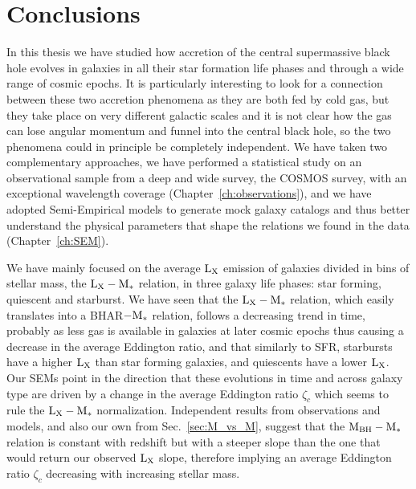 \chapter{Conclusions}


In this thesis we have studied how accretion of the central supermassive black hole evolves in galaxies in all their star formation life phases and through a wide range of cosmic epochs. It is particularly interesting to look for a connection between these two accretion phenomena as they are both fed by cold gas, but they take place on very different galactic scales and it is not clear how the gas can lose angular momentum and funnel into the central black hole, so the two phenomena could in principle be completely independent. We have taken two complementary approaches, we have performed a statistical study on an observational sample from a deep and wide survey, the COSMOS survey, with an exceptional wavelength coverage (Chapter~\ref{ch:observations}), and we have adopted Semi-Empirical models to generate mock galaxy catalogs and thus better understand the physical parameters that shape the relations we found in the data (Chapter~\ref{ch:SEM}).

We have mainly focused on the average ${\rm L}_{\rm X}$ emission of galaxies divided in bins of stellar mass, the ${\rm L}_{\rm X}-{\rm M}_*$ relation, in three galaxy life phases: star forming, quiescent and starburst. We have seen that the ${\rm L}_{\rm X}-{\rm M}_*$ relation, which easily translates into a BHAR$-{\rm M}_*$ relation, follows a decreasing trend in time, probably as less gas is available in galaxies at later cosmic epochs thus causing a decrease in the average Eddington ratio, and that similarly to SFR, starbursts have a higher ${\rm L}_{\rm X}$ than star forming galaxies, and quiescents have a lower ${\rm L}_{\rm X}$. Our SEMs point in the direction that these evolutions in time and across galaxy type are driven by a change in the average Eddington ratio $\zeta_c$ which seems to rule the ${\rm L}_{\rm X}-{\rm M}_*$ normalization. Independent results from observations and models, and also our own from Sec.~\ref{sec:M_vs_M}, suggest that the ${\rm M}_{\rm BH}-{\rm M}_*$ relation is constant with redshift but with a steeper slope than the one that would return our observed ${\rm L}_{\rm X}$ slope, therefore implying an average Eddington ratio $\zeta_c$ decreasing with increasing stellar mass.

